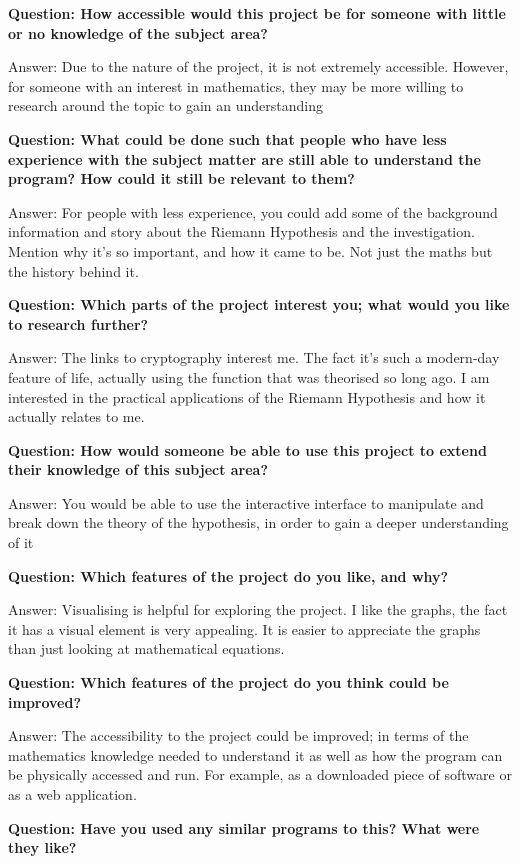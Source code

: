 \documentclass[12pt]{article}
\begin{document}
\textbf{Question: How accessible would this project be for someone with little or no knowledge of the subject area?}

Answer: Due to the nature of the project, it is not extremely accessible. However, for someone with an interest in mathematics, they may be more willing to research around the topic to gain an understanding

\textbf{Question: What could be done such that people who have less experience with the subject matter are still able to understand the program? How could it still be relevant to them?}

Answer: For people with less experience, you could add some of the background information and story about the Riemann Hypothesis and the investigation. Mention why it's so important, and how it came to be. Not just the maths but the history behind it.

\textbf{Question: Which parts of the project interest you; what would you like to research further?}

Answer: The links to cryptography interest me. The fact it’s such a modern-day feature of life, actually using the function that was theorised so long ago. I am interested in the practical applications of the Riemann Hypothesis and how it actually relates to me.

\textbf{Question: How would someone be able to use this project to extend their knowledge of this subject area?}

Answer: You would be able to use the interactive interface to manipulate and break down the theory of the hypothesis, in order to gain a deeper understanding of it

\textbf{Question: Which features of the project do you like, and why?}

Answer: Visualising is helpful for exploring the project. I like the graphs, the fact it has a visual element is very appealing. It is easier to appreciate the graphs than just looking at mathematical equations.

\textbf{Question: Which features of the project do you think could be improved?}

Answer: The accessibility to the project could be improved; in terms of the mathematics knowledge needed to understand it as well as how the program can be physically accessed and run. For example, as a downloaded piece of software or as a web application.

\textbf{Question: Have you used any similar programs to this? What were they like?}
\end{document}
